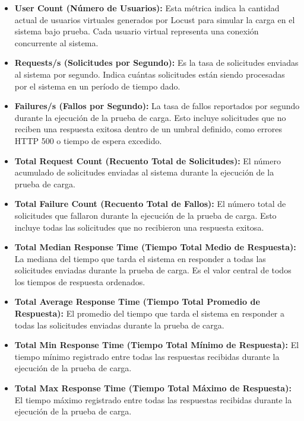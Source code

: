 \documentclass[10pt,times,twocolumn]{article}
\begin{document}
\begin{itemize}

\item \textbf{User Count (Número de Usuarios): }
Esta métrica indica la cantidad actual de usuarios virtuales generados por Locust para simular la carga en el sistema bajo prueba. Cada usuario virtual representa una conexión concurrente al sistema.

\item \textbf{Requests/s (Solicitudes por Segundo): }
Es la tasa de solicitudes enviadas al sistema por segundo. Indica cuántas solicitudes están siendo procesadas por el sistema en un período de tiempo dado.

\item \textbf{Failures/s (Fallos por Segundo): }
La tasa de fallos reportados por segundo durante la ejecución de la prueba de carga. Esto incluye solicitudes que no reciben una respuesta exitosa dentro de un umbral definido, como errores HTTP 500 o tiempo de espera excedido.

\item \textbf{Total Request Count (Recuento Total de Solicitudes): }
El número acumulado de solicitudes enviadas al sistema durante la ejecución de la prueba de carga.

\item \textbf{Total Failure Count (Recuento Total de Fallos): }
El número total de solicitudes que fallaron durante la ejecución de la prueba de carga. Esto incluye todas las solicitudes que no recibieron una respuesta exitosa.

\item \textbf{Total Median Response Time (Tiempo Total Medio de Respuesta): }
La mediana del tiempo que tarda el sistema en responder a todas las solicitudes enviadas durante la prueba de carga. Es el valor central de todos los tiempos de respuesta ordenados.

\item \textbf{Total Average Response Time (Tiempo Total Promedio de Respuesta): }
El promedio del tiempo que tarda el sistema en responder a todas las solicitudes enviadas durante la prueba de carga.

\item \textbf{Total Min Response Time (Tiempo Total Mínimo de Respuesta): }
El tiempo mínimo registrado entre todas las respuestas recibidas durante la ejecución de la prueba de carga.

\item \textbf{Total Max Response Time (Tiempo Total Máximo de Respuesta): }
El tiempo máximo registrado entre todas las respuestas recibidas durante la ejecución de la prueba de carga.

\end{itemize}
\end{document}
